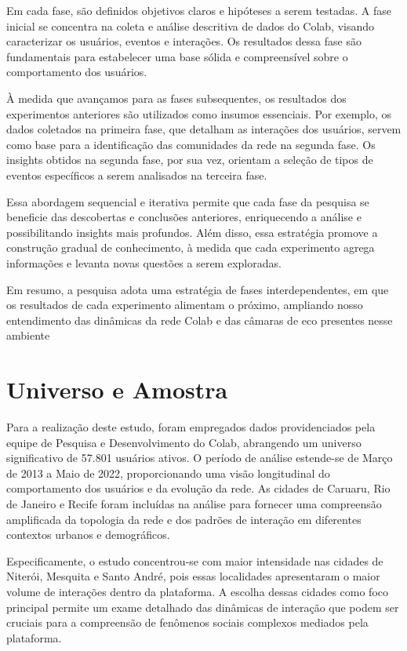 Em cada fase, são definidos objetivos claros e hipóteses a serem testadas. A fase inicial se concentra na coleta e análise descritiva de dados do Colab, visando caracterizar os usuários, eventos e interações. Os resultados dessa fase são fundamentais para estabelecer uma base sólida e compreensível sobre o comportamento dos usuários.

À medida que avançamos para as fases subsequentes, os resultados dos experimentos anteriores são utilizados como insumos essenciais. Por exemplo, os dados coletados na primeira fase, que detalham as interações dos usuários, servem como base para a identificação das comunidades da rede na segunda fase. Os insights obtidos na segunda fase, por sua vez, orientam a seleção de tipos de eventos específicos a serem analisados na terceira fase.

Essa abordagem sequencial e iterativa permite que cada fase da pesquisa se beneficie das descobertas e conclusões anteriores, enriquecendo a análise e possibilitando insights mais profundos. Além disso, essa estratégia promove a construção gradual de conhecimento, à medida que cada experimento agrega informações e levanta novas questões a serem exploradas.

Em resumo, a pesquisa adota uma estratégia de fases interdependentes, em que os resultados de cada experimento alimentam o próximo, ampliando nosso entendimento das dinâmicas da rede Colab e das câmaras de eco presentes nesse ambiente

\section{Universo e Amostra}

Para a realização deste estudo, foram empregados dados providenciados pela equipe de Pesquisa e Desenvolvimento do Colab, abrangendo um universo significativo de 57.801 usuários ativos. O período de análise estende-se de Março de 2013 a Maio de 2022, proporcionando uma visão longitudinal do comportamento dos usuários e da evolução da rede. As cidades de Caruaru, Rio de Janeiro e Recife foram incluídas na análise para fornecer uma compreensão amplificada da topologia da rede e dos padrões de interação em diferentes contextos urbanos e demográficos.

Especificamente, o estudo concentrou-se com maior intensidade nas cidades de Niterói, Mesquita e Santo André, pois essas localidades apresentaram o maior volume de interações dentro da plataforma. A escolha dessas cidades como foco principal permite um exame detalhado das dinâmicas de interação que podem ser cruciais para a compreensão de fenômenos sociais complexos mediados pela plataforma.

